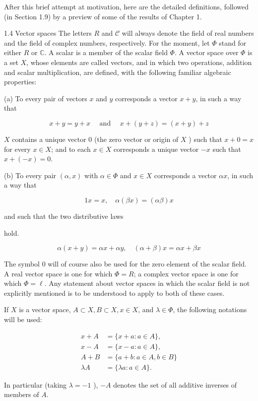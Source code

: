 \documentclass[10pt]{article}
\begin{document}
After this brief attempt at motivation, here are the detailed definitions, followed (in Section 1.9) by a preview of some of the results of Chapter 1.

1.4 Vector spaces The letters $R$ and $\mathscr{C}$ will always denote the field of real numbers and the field of complex numbers, respectively. For the moment, let $\Phi$ stand for either $R$ or $\mathbb{C}$. A scalar is a member of the scalar field $\Phi$. A vector space over $\Phi$ is a set $X$, whose elements are called vectors, and in which two operations, addition and scalar multiplication, are defined, with the following familiar algebraic properties:

(a) To every pair of vectors $x$ and $y$ corresponds a vector $x+y$, in such a way that

$$
x+y=y+x \quad \text { and } \quad x+(y+z)=(x+y)+z
$$

$X$ contains a unique vector 0 (the zero vector or origin of $X$ ) such that $x+0=x$ for every $x \in X$; and to each $x \in X$ corresponds a unique vector $-x$ such that $x+(-x)=0$.

(b) To every pair $(\alpha, x)$ with $\alpha \in \Phi$ and $x \in X$ corresponds a vector $\alpha x$, in such a way that

$$
1 x=x, \quad \alpha(\beta x)=(\alpha \beta) x
$$

and such that the two distributive laws

hold.

$$
\alpha(x+y)=\alpha x+\alpha y, \quad(\alpha+\beta) x=\alpha x+\beta x
$$

The symbol 0 will of course also be used for the zero element of the scalar field. A real vector space is one for which $\Phi=R$; a complex vector space is one for which $\Phi=\ell$. Any statement about vector spaces in which the scalar field is not explicitly mentioned is to be understood to apply to both of these cases.

If $X$ is a vector space, $A \subset X, B \subset X, x \in X$, and $\lambda \in \Phi$, the following notations will be used:

$$
\begin{aligned}
x+A & =\{x+a: a \in A\}, \\
x-A & =\{x-a: a \in A\}, \\
A+B & =\{a+b: a \in A, b \in B\} \\
\lambda A & =\{\lambda a: a \in A\} .
\end{aligned}
$$

In particular (taking $\lambda=-1$ ), $-A$ denotes the set of all additive inverses of members of $A$.
\end{document}
